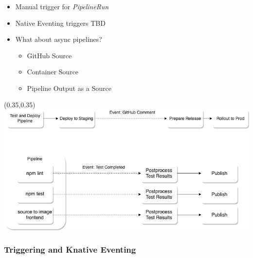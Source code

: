 \documentclass[aspectratio=169,11pt,hyperref={colorlinks=true}]{beamer}
\begin{document}
\begin{lblackrwhiteframe}
\begin{blackframe}
\begin{2columnsframe}
  {
  \begin{itemize}
    \item Manual trigger for {\em PipelineRun}
    \item Native Eventing triggers TBD
    \item What about async pipelines?
    \begin{itemize}
      \item GitHub Source
      \item Container Source
      \item Pipeline Output as a Source
    \end{itemize}
  \end{itemize}
  }
  {
  \begin{textblock*}{0.6\paperwidth}(0.35\paperwidth,0.35\paperheight)
    \centering
    \includegraphics[width=0.6\paperwidth]{img/async_pipelines.png}
  \end{textblock*}
  }
  \frametitle{Triggering and Knative Eventing}
\end{2columnsframe}


\end{blackframe}
\end{lblackrwhiteframe}
\end{document}
